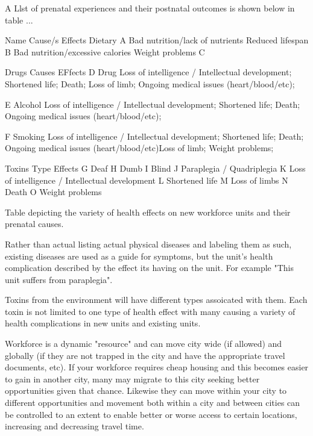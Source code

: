 A Llst of prenatal experiences and their postnatal outcomes is shown below in table ...



 Name  		Cause/s					Effects				
Dietary							
  A		Bad nutrition/lack of nutrients		Reduced lifespan			
  B		Bad nutrition/excessive calories	Weight problems
  C							
							
Drugs		Causes					EFfects	
  D		Drug					Loss of intelligence / Intellectual development; Shortened life; Death; Loss of limb; Ongoing 								medical issues (heart/blood/etc);
  
  E		Alcohol					Loss of intelligence / Intellectual development; Shortened life; Death; Ongoing medical issues 								(heart/blood/etc);
  
  F		Smoking					Loss of intelligence / Intellectual development; Shortened life; Death; Ongoing medical issues 								(heart/blood/etc)Loss of limb; Weight problems;
							
Toxins		Type					Effects	
  G							Deaf	
  H							Dumb	
  I							Blind
  J							Paraplegia / Quadriplegia
  K							Loss of intelligence / Intellectual development
  L							Shortened life
  M							Loss of limbs
  N							Death
  O							Weight problems

Table depicting the variety of health effects on new workforce units and their prenatal causes.


Rather than actual listing actual physical diseases and labeling them as such, existing diseases are used as a guide for symptoms, but the unit's health complication described by the effect its having on the unit. For example "This unit suffers from paraplegia".



Toxins from the environment will have different types assoicated with them. Each toxin is not limited to one type of health effect with many causing a variety of health complications in new units and existing units.   



Workforce is a dynamic "resource" and can move city wide (if allowed) and globally (if they are not trapped in the city and have the appropriate travel documents, etc). If your workforce requires cheap housing and this becomes easier to gain in another city, many may migrate to this city seeking better opportunities given that chance. Likewise they can move within your city to different opportunities and movement both within a city and between cities can be controlled to an extent to enable better or worse access to certain locations, increasing and decreasing travel time.

